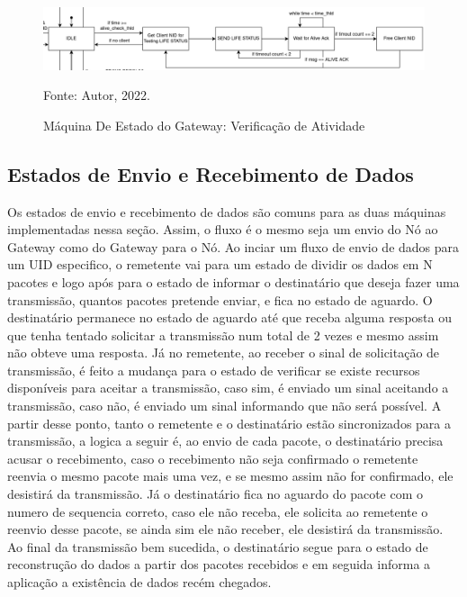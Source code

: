 \begin{figure}[htp]
    \centering
	\caption{Máquina De Estado do Gateway: Verificação de Atividade}
    \includegraphics[width=\textwidth]{img/gw-alive.drawio.png}
    
    Fonte: Autor, 2022.
    \label{fig:fsm-gw-alive}
\end{figure}

\subsection{Estados de Envio e Recebimento de Dados}

Os estados de envio e recebimento de dados são comuns para as duas máquinas
implementadas nessa seção. Assim, o fluxo é o mesmo seja um envio do Nó ao
Gateway como do Gateway para o Nó. Ao inciar um fluxo de envio de dados para
um UID especifico, o remetente vai para um estado de dividir os dados em N
pacotes e logo após para o estado de informar o destinatário que deseja fazer
uma transmissão, quantos pacotes pretende enviar, e fica no estado de aguardo.
O destinatário permanece no estado de aguardo até que receba alguma resposta ou
que tenha tentado solicitar a transmissão num total de 2 vezes e mesmo assim não
obteve uma resposta. Já no remetente, ao receber o sinal de solicitação de transmissão,
é feito a mudança para o estado de verificar se existe recursos disponíveis para aceitar
a transmissão, caso sim, é enviado um sinal aceitando a transmissão, caso não, é enviado
um sinal informando que não será possível. A partir desse ponto, tanto o remetente e o
destinatário estão sincronizados para a transmissão, a logica a seguir é, ao envio de cada
pacote, o destinatário precisa acusar o recebimento, caso o recebimento não seja confirmado
o remetente reenvia o mesmo pacote mais uma vez, e se mesmo assim não for confirmado, ele
desistirá da transmissão. Já o destinatário fica no aguardo do pacote com o numero de sequencia
correto, caso ele não receba, ele solicita ao remetente o reenvio desse pacote, se ainda sim ele
não receber, ele desistirá da transmissão. Ao final da transmissão bem sucedida, o destinatário
segue para o estado de reconstrução do dados a partir dos pacotes recebidos e em seguida informa
a aplicação a existência de dados recém chegados.

